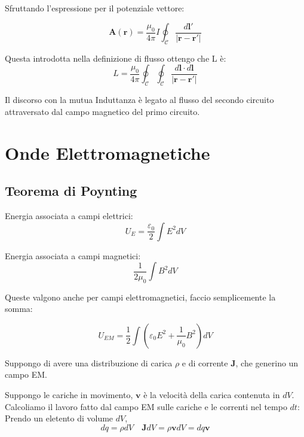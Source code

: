 \documentclass[a4paper]{scrarticle}
\begin{document}
Sfruttando l'espressione per il potenziale vettore:

\begin{equation}
    \bm A (\bm r) = \frac{\mu_0}{4\pi} I \oint_{\mathcal{C}} \frac{d \bm l'}{|\bm r - \bm r'|}
\end{equation}

Questa introdotta nella definizione di flusso ottengo che L è:
\begin{equation}
    L = \frac{\mu_0}{4\pi} \oint_{\mathcal{C}}\oint_{\mathcal{C}} \frac{d\bm l\cdot d\bm l}{|\bm r - \bm r'|}
\end{equation}

Il discorso con la mutua Induttanza è legato al flusso del secondo circuito attraversato dal campo magnetico del primo circuito.


\section{Onde Elettromagnetiche}

\subsection{Teorema di Poynting}

Energia associata a campi elettrici:
\begin{equation*}
    U_E = \frac{\varepsilon_0}{2} \int E^2 dV 
\end{equation*}

Energia associata a campi magnetici:
\begin{equation*}
    \frac{1}{2 \mu_0} \int B^2 dV
\end{equation*}

Queste valgono anche per campi elettromagnetici, faccio semplicemente la somma:

\begin{equation}
    U_{EM} = \frac{1}{2} \int (\varepsilon_0 E^2 + \frac{1}{\mu_0} B^2)dV
\end{equation}

Suppongo di avere una distribuzione di carica $\rho$ e di corrente $\bm J$, che generino un campo EM.

Suppongo le cariche in movimento, $\bm v$ è la velocità della carica contenuta in $dV$.
Calcoliamo il lavoro fatto dal campo EM sulle cariche e le correnti nel tempo $dt$:
Prendo un eletento di volume $dV$,
\begin{equation*}
    dq = \rho dV \quad \bm J dV = \rho \bm v dV = dq \bm v
\end{equation*}
\end{document}
